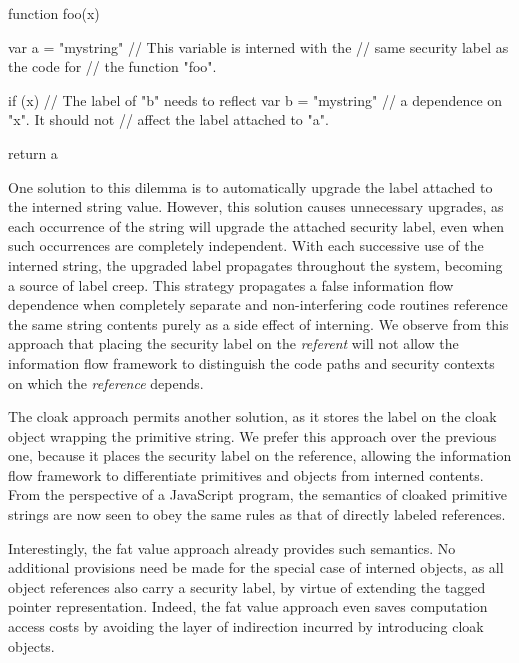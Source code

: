 \begin{jscode}
function foo(x) {
  var a = "mystring"    // This variable is interned with the
                        // same security label as the code for
                        // the function "foo".

  if (x) {              // The label of "b" needs to reflect
    var b = "mystring"  // a dependence on "x". It should not
  }                     // affect the label attached to "a".

  return a
}
\end{jscode}

One solution to this dilemma is to automatically upgrade the label attached to the interned string value.
However, this solution causes unnecessary upgrades, as each occurrence of the string will upgrade the attached security label, even when such occurrences are completely independent.
With each successive use of the interned string, the upgraded label propagates throughout the system, becoming a source of label creep.
This strategy propagates a false information flow dependence when completely separate and non-interfering code routines reference the same string contents purely as a side effect of interning.
We observe from this approach that placing the security label on the \emph{referent} will not allow the information flow framework to distinguish the code paths and security contexts on which the \emph{reference} depends.

The cloak approach permits another solution, as it stores the label on the cloak object wrapping the primitive string.
We prefer this approach over the previous one, because it places the security label on the reference, allowing the information flow framework to differentiate primitives and objects from interned contents.
From the perspective of a JavaScript program, the semantics of cloaked primitive strings are now seen to obey the same rules as that of directly labeled references.

Interestingly, the fat value approach already provides such semantics.
No additional provisions need be made for the special case of interned objects, as all object references also carry a security label, by virtue of extending the tagged pointer representation.
Indeed, the fat value approach even saves computation access costs by avoiding the layer of indirection incurred by introducing cloak objects.

